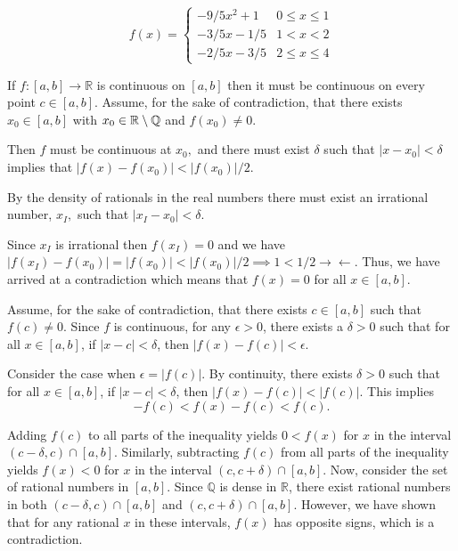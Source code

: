 \documentclass{report}
\begin{document}
$$
f(x)=\left\{\begin{array}{cc}
-9/5 x^2+1 & 0 \leq x \leq 1 \\
-3/5 x - 1/5 & 1<x<2 \\
-2/5 x - 3/5 & 2 \leq x \leq 4
\end{array}\right.
$$
\begin{myproof}
    

If $f:[a, b] \rightarrow \mathbb{R}$ is continuous on $[a, b]$ then it must be continuous on every point $c \in [a,b].$ Assume, for the sake of contradiction, that there exists $x_0 \in [a,b]$ with $x_0 \in \RR \setminus \QQ$ and $f(x_0) \not =0.$

Then $f$ must be continuous at $x_0,$ and there must exist $\delta$ such that $|x-x_0| < \delta$ implies that $|f(x) - f(x_0)| < |f(x_0)|/2.$ 

By the density of rationals in the real numbers there must exist an irrational number, $x_I,$ such that $|x_I - x_0| < \delta.$ 

Since $x_I$ is irrational then $f(x_I) = 0$ and we have $|f(x_I) - f(x_0)| =  |f(x_0)| < \left|f(x_0)\right|/2 \implies 1 < 1/2 \rightarrow\!\leftarrow.$  Thus, we have arrived at a contradiction which means that $f(x)=0$ for all $x \in[a, b].$

\end{myproof}


Assume, for the sake of contradiction, that there exists $c \in[a, b]$ such that $f(c) \neq 0$. Since $f$ is continuous, for any $\epsilon>0$, there exists a $\delta>0$ such that for all $x \in[a, b]$, if $|x-c|<\delta$, then $|f(x)-f(c)|<\epsilon$.

Consider the case when $\epsilon=|f(c)|$. By continuity, there exists $\delta>0$ such that for all $x \in[a, b]$, if $|x-c|<\delta$, then $|f(x)-f(c)|<|f(c)|$. This implies
$$
-f(c)<f(x)-f(c)<f(c) .
$$

Adding $f(c)$ to all parts of the inequality yields $0<f(x)$ for $x$ in the interval $(c-\delta, c) \cap[a, b]$. Similarly, subtracting $f(c)$ from all parts of the inequality yields $f(x)<0$ for $x$ in the interval $(c, c+\delta) \cap[a, b]$. Now, consider the set of rational numbers in $[a, b]$. Since $\mathbb{Q}$ is dense in $\mathbb{R}$, there exist rational numbers in both $(c-\delta, c) \cap[a, b]$ and $(c, c+\delta) \cap[a, b]$. However, we have shown that for any rational $x$ in these intervals, $f(x)$ has opposite signs, which is a contradiction.
\end{document}
